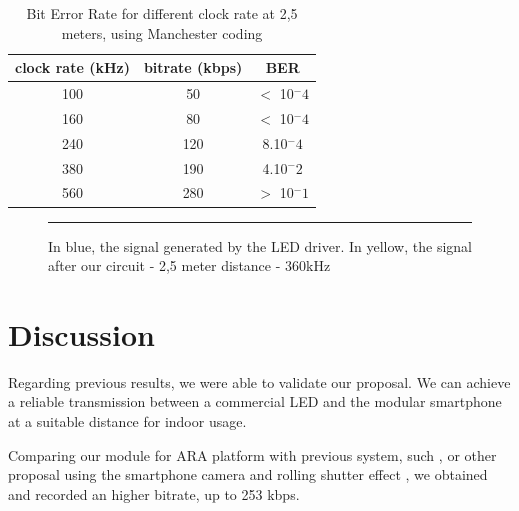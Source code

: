 \begin{table}[htbp]
\begin{center}
\begin{tabular}{|c|c|c|}
  \hline
  clock rate (kHz) & bitrate (kbps) & BER \\
  \hline
  100 & 50 & $<$ 10$^-4$ \\
  160 & 80 & $<$ 10$^-4$ \\
  240 & 120 & 8.10$^-4$ \\
  380 & 190 & 4.10$^-2$ \\
  560 & 280 & $>$ 10$^-1$ \\
  \hline
\end{tabular}
\end{center}
\caption{Bit Error Rate for different clock rate at 2,5 meters, using Manchester coding}
\label{tab:ber-manchester}
\end{table}

\begin{figure}[htbp]
	\centering
		\rule{35em}{0.5pt}
		\caption
        {In blue, the signal generated by the LED driver. In yellow, the signal after our circuit - 2,5 meter distance - 360kHz}
		\label{fig:manchester-problem}
	\end{figure}
    
 

\section{Discussion}

Regarding previous results, we were able to validate our proposal. We can achieve a reliable transmission between a commercial LED and the modular smartphone at a suitable distance for indoor usage.

Comparing our  module for ARA platform with previous system, such \citep{phycomp}, or other proposal using the smartphone camera and rolling shutter effect  \citep{rolling}, we obtained and recorded an higher bitrate, up to 253 kbps.
\citep{phycomp}